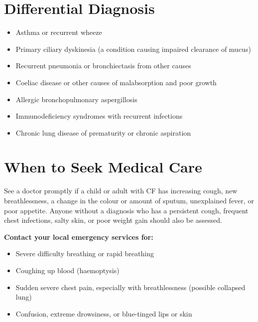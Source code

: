 \section*{Differential Diagnosis}
\begin{itemize}
    \item Asthma or recurrent wheeze
    \item Primary ciliary dyskinesia (a condition causing impaired clearance of mucus)
    \item Recurrent pneumonia or bronchiectasis from other causes
    \item Coeliac disease or other causes of malabsorption and poor growth
    \item Allergic bronchopulmonary aspergillosis
    \item Immunodeficiency syndromes with recurrent infections
    \item Chronic lung disease of prematurity or chronic aspiration
\end{itemize}

\section*{When to Seek Medical Care}
See a doctor promptly if a child or adult with CF has increasing cough, new breathlessness, a change in the colour or amount of sputum, unexplained fever, or poor appetite. Anyone without a diagnosis who has a persistent cough, frequent chest infections, salty skin, or poor weight gain should also be assessed.

\textbf{Contact your local emergency services for:}
\begin{itemize}
    \item Severe difficulty breathing or rapid breathing
    \item Coughing up blood (haemoptysis)
    \item Sudden severe chest pain, especially with breathlessness (possible collapsed lung)
    \item Confusion, extreme drowsiness, or blue-tinged lips or skin
\end{itemize}

